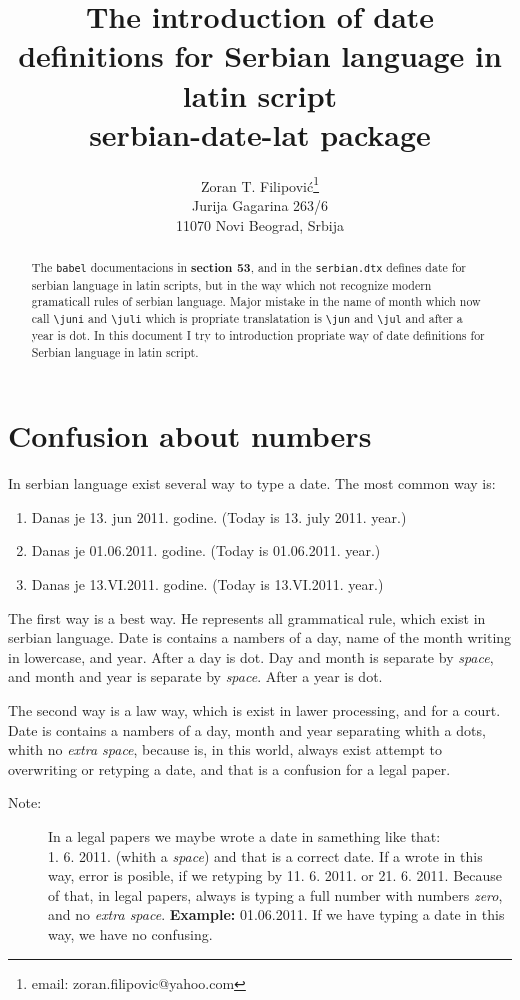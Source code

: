 \documentclass[a4paper,12pt]{article}
\title{The introduction of date definitions for Serbian language in latin script \\
\textsf{serbian-date-lat} package}
\author{Zoran T. Filipovi\'{c}\protect\footnote{email: zoran.filipovic@yahoo.com} \\ 
        Jurija Gagarina 263/6 \\ 
        11070 Novi Beograd, Srbija}
\begin{document}
\frenchspacing
\maketitle

\begin{abstract}
The \verb|babel| documentacions in \textbf{section 53}, and in the \verb|serbian.dtx| 
defines date for serbian language in latin scripts, but in the way which not 
recognize modern gramaticall rules of serbian language. Major mistake in the name of month
which now call \verb|\juni| and \verb|\juli| which is propriate translatation is 
\verb|\jun| and \verb|\jul| and after a year is dot. In this document I try to introduction propriate way of date definitions for Serbian language in latin script. 
\end{abstract}

\section{Confusion about numbers}

In serbian language exist several way to type a date. The most common way is:

\begin{enumerate}
\item{Danas je 13. jun 2011. godine. (Today is 13. july 2011. year.)}
\item{Danas je 01.06.2011. godine. (Today is 01.06.2011. year.)}
\item{Danas je 13.VI.2011. godine. (Today is 13.VI.2011. year.)}
\end{enumerate}

The first way is a best way. He represents all grammatical rule, which exist in 
serbian language. Date is contains a nambers of a day, name of the month writing 
in lowercase, and year. After a day is dot. Day and month is separate by 
\textit{space}, and month and year is separate by \textit{space}. After a year is dot. 
 
The second way is a law way, which is exist in lawer processing, and for a court.
Date is contains a nambers of a day, month and year separating whith a dots, whith no 
\textit{extra space}, because is, in this world, always exist attempt to overwriting or 
retyping a date, and that is a confusion for a legal paper. 

\begin{description}
\item[Note:] In a legal papers we maybe wrote a date in samething like that: \\
1. 6. 2011. (whith a \textit{space}) and that is a correct date. If a wrote in 
this way, error is posible, if we retyping by 11. 6. 2011. or 21. 6. 2011.
Because of that, in legal papers, always is typing a full number with numbers 
\textit{zero}, and no \textit{extra space}. \textbf{Example:} 01.06.2011. If we have 
typing a date in this way, we have no confusing. 
\end{description}
\end{document}
